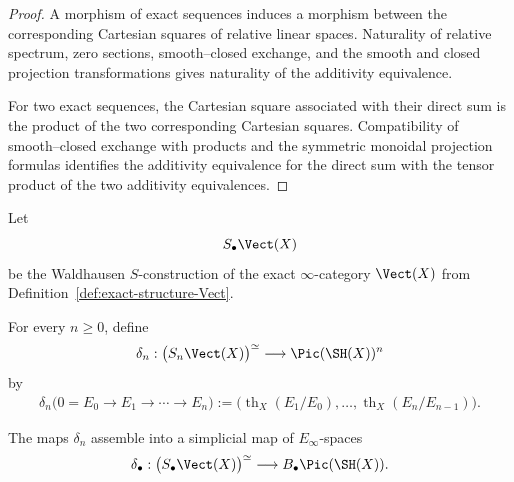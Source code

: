 \begin{proof}
A morphism of exact sequences induces a morphism between the corresponding
Cartesian squares of relative linear spaces.  Naturality of relative
spectrum, zero sections, smooth--closed exchange, and the smooth and closed
projection transformations gives naturality of the additivity equivalence.

For two exact sequences, the Cartesian square associated with their direct
sum is the product of the two corresponding Cartesian squares.  Compatibility
of smooth--closed exchange with products and the symmetric monoidal
projection formulas identifies the additivity equivalence for the direct sum
with the tensor product of the two additivity equivalences.
\end{proof}

\begin{proposition}
\label{prop:coherent-thom-additivity}
Let
\[
    S_\bullet\Vect(X)
\]
be the Waldhausen \(S\)-construction of the exact \(\infty\)-category
\(\Vect(X)\) from
Definition~\ref{def:exact-structure-Vect}.

For every \(n\geq0\), define
\[
    \delta_n:
    \bigl(
      S_n\Vect(X)
    \bigr)^\simeq
    \longrightarrow
    \Pic(\SH(X))^n
\]
by
\[
\begin{aligned}
    \delta_n
    \bigl(
      0=E_0\to E_1\to\cdots\to E_n
    \bigr)
    :=
    \bigl(
      \operatorname{th}_X(E_1/E_0),
      \ldots,
      \operatorname{th}_X(E_n/E_{n-1})
    \bigr).
\end{aligned}
\]

The maps \(\delta_n\) assemble into a simplicial map of
\(E_\infty\)-spaces
\[
    \delta_\bullet:
    \bigl(
      S_\bullet\Vect(X)
    \bigr)^\simeq
    \longrightarrow
    B_\bullet\Pic(\SH(X)).
\]
\end{proposition}

